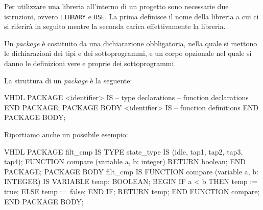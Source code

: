 \documentclass[10pt,a4paper,oneside]{scrbook}
\begin{document}
Per utilizzare una libreria all'interno di un progetto sono necessarie due 
istruzioni, ovvero \texttt{LIBRARY} e \texttt{USE}.
La prima definisce il nome della libreria a cui ci si riferirà in seguito 
mentre la seconda carica effettivamente la libreria.

Un \textit{package} è costituito da una dichiarazione obbligatoria, nella quale 
si mettono le dichiarazioni dei tipi e dei sottoprogrammi, e un corpo opzionale 
nel quale si danno le definizioni vere e proprie dei sottoprogrammi.

La struttura di un \textit{package} è la seguente:
\begin{sourcecode}{VHDL}
PACKAGE <identifier> IS
    -- type declarations
    -- function declarations
END PACKAGE;
PACKAGE BODY <identifier> IS
    -- function definitions
END PACKAGE BODY;
\end{sourcecode}
Riportiamo anche un possibile esempio:
\begin{sourcecode}{VHDL}
PACKAGE filt_cmp IS
    TYPE state_type IS (idle, tap1, tap2, tap3, tap4);
    FUNCTION compare (variable a, b: integer) RETURN boolean;
END PACKAGE;
PACKAGE BODY filt_cmp IS
    FUNCTION compare (variable a, b: INTEGER) IS
        VARIABLE temp: BOOLEAN;
    BEGIN
        IF a < b THEN
            temp := true;
        ELSE
            temp := false;
        END IF;
        RETURN temp;
    END FUNCTION compare;
END PACKAGE BODY;
\end{sourcecode}
\end{document}
